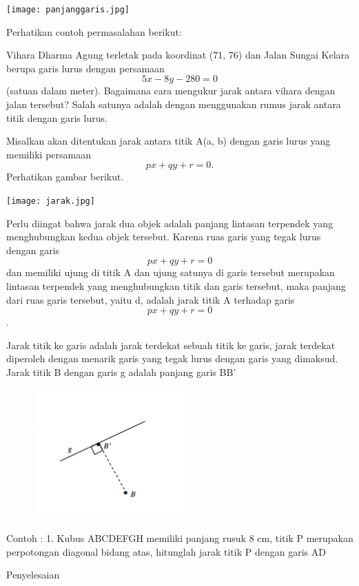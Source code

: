 \documentclass[11pt,fleqn]{book} %
\begin{document}
\begin{enumerate}
\begin{center}
\texttt{[image: panjanggaris.jpg]}
\end{center}

Perhatikan contoh permasalahan berikut:

Vihara Dharma Agung terletak pada koordinat (71, 76) dan Jalan Sungai Kelara berupa garis lurus dengan persamaan $$5x-8y-280=0$$ (satuan dalam meter). Bagaimana cara mengukur jarak antara vihara dengan jalan tersebut? Salah satunya adalah dengan menggunakan rumus jarak antara titik dengan garis lurus.


\end{enumerate}

Misalkan akan ditentukan jarak antara titik A(a, b) dengan garis lurus yang memiliki persamaan $$px+qy+r = 0.$$ Perhatikan gambar berikut.

\begin{center}
\texttt{[image: jarak.jpg]}
\end{center}

Perlu diingat bahwa jarak dua objek adalah panjang lintasan terpendek yang menghubungkan kedua objek tersebut. Karena ruas garis yang tegak lurus dengan garis $$px+qy+r = 0$$ dan memiliki ujung di titik A dan ujung satunya di garis tersebut merupakan lintasan terpendek yang menghubungkan titik dan garis tersebut, maka panjang dari ruas garis tersebut, yaitu d, adalah jarak titik A terhadap garis $$px+qy+r = 0$$.

Jarak titik ke garis adalah jarak terdekat sebuah titik ke garis, jarak terdekat diperoleh dengan menarik garis yang tegak lurus dengan garis yang dimaksud.
Jarak titik B dengan garis g adalah panjang garis BB’  

\includegraphics[width = 8cm, height= 5cm]{Pictures/gi1.png}

Contoh :
1. Kubus ABCDEFGH memiliki panjang rusuk 8 cm, titik P merupakan perpotongan
diagonal bidang atas, hitunglah jarak titik P dengan garis AD

Penyelesaian
\end{document}
